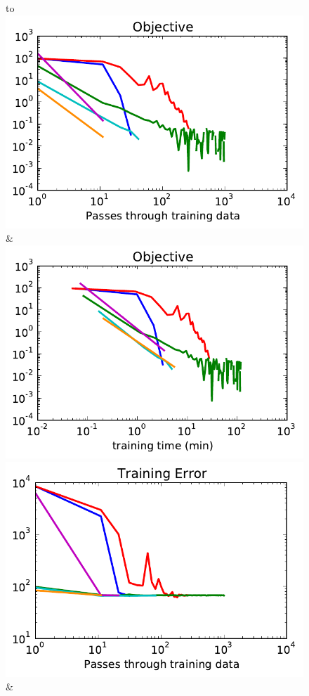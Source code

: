\begin{figure}
    \begin{tabu} to 
    \\[-3mm]
    \includegraphics[width=\linewidth]{evaluation/images/msrc}&%
    \includegraphics[width=\linewidth]{evaluation/images/msrc_time}\\
    \includegraphics[width=\linewidth]{evaluation/images/msrc_loss}&%

\end{tabu}
\end{figure}

